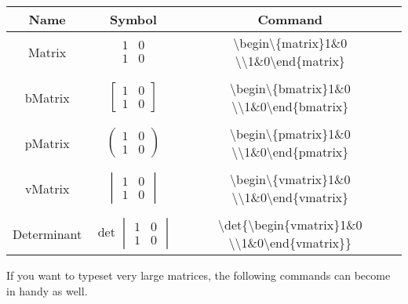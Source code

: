   \begin{center}
  \begin{tabular}{ccc}
  \toprule  %
  Name&	Symbol&	Command\\
  \midrule  %
  Matrix 
    & $\begin{matrix}1&0\\1&0\end{matrix}$ 
    & \textbackslash begin\textbackslash\{matrix\}1\&0 \textbackslash\textbackslash 1\&0\textbackslash end\{matrix\} \\
  \\
  bMatrix 
    & $\begin{bmatrix}1&0\\1&0\end{bmatrix}$ 
    & \textbackslash begin\textbackslash\{bmatrix\}1\&0 \textbackslash\textbackslash 1\&0\textbackslash end\{bmatrix\} \\
  \\
  pMatrix 
    & $\begin{pmatrix}1&0\\1&0\end{pmatrix}$ 
    & \textbackslash begin\textbackslash\{pmatrix\}1\&0 \textbackslash\textbackslash 1\&0\textbackslash end\{pmatrix\} \\
  \\
  vMatrix 
    & $\begin{vmatrix}1&0\\1&0\end{vmatrix}$ 
    & \textbackslash begin\textbackslash\{vmatrix\}1\&0 \textbackslash\textbackslash 1\&0\textbackslash end\{vmatrix\} \\
  \\
  Determinant 
    & $\det{\begin{vmatrix}1&0\\1&0\end{vmatrix}}$ 
    & \textbackslash det\{\textbackslash begin\{vmatrix\}1\&0 \textbackslash\textbackslash 1\&0\textbackslash end\{vmatrix\}\} \\
  \bottomrule %
  \end{tabular}
  \end{center}
  If you want to typeset very large matrices, the following commands can become in handy as well.
  
  
  
  
